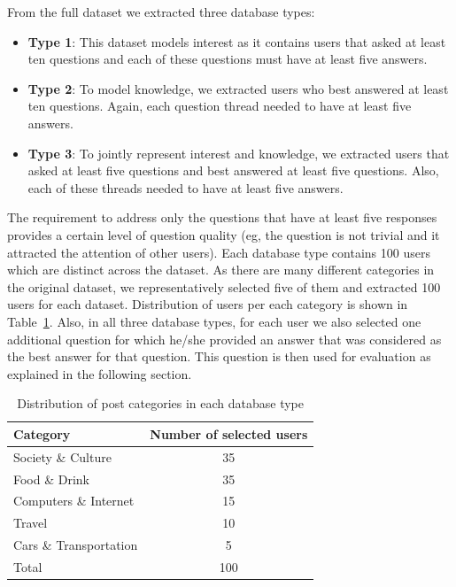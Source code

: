 \documentclass[conference]{IEEEtran}
\newcommand{\tblref}[1]{Table~\ref{#1}}
\begin{document}
From the full dataset we extracted three database types:
\begin{itemize}
	\item {\bf Type 1}: This dataset models interest as it contains users that asked at least ten questions and each of these questions must have at least five answers.
	\item {\bf Type 2}: To model knowledge, we extracted users who best answered at least ten questions. Again, each question thread needed to have at least five answers.
	\item {\bf Type 3}: To jointly represent interest and knowledge, we extracted users that asked at least five questions and best answered at least five questions. Also, each of these threads needed to have at least five answers.
\end{itemize}
The requirement to address only the questions that have at least five responses provides a certain level of question quality (eg, the question is not trivial and it attracted the attention of other users). Each database type contains 100 users which are distinct across the dataset. As there are many different categories in the original dataset, we representatively selected five of them and extracted 100 users for each dataset. Distribution of users per each category is shown in \tblref{tab:datasets}.
Also, in all three database types, for each user we also selected one additional question for which he/she provided an answer that was considered as the best answer for that question. This question is then used for evaluation as explained in the following section. 
\begin{table}[!h]
	\setlength{\belowcaptionskip}{-5pt}
	\centering
	\renewcommand{\arraystretch}{1.3}
	\caption{Distribution of post categories in each database type}
	\addtolength{\parskip}{-0.2cm}
	\label{tab:datasets}
	\begin{tabular}{l|c}\hline
		Category & Number of selected users\\\hline\hline
		Society \& Culture & 35\\
		Food \& Drink & 35\\
		Computers \& Internet & 15\\
		Travel & 10\\
		Cars \& Transportation & 5\\\hline\hline
		Total & 100\\\hline
	\end{tabular}
	
\end{table}
\vspace{-0.5cm}
\end{document}
